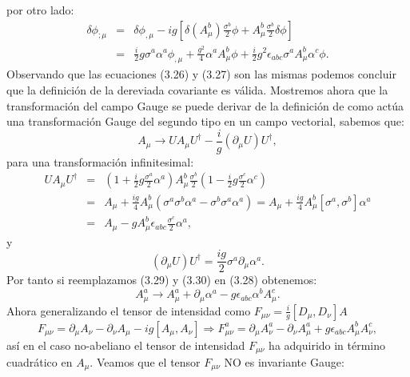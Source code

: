 por otro lado:
\begin{eqnarray}
\nonumber \delta\phi_{;\mu}&=&\delta\phi_{,\mu}-ig[\delta(A_{\mu}^{b})\frac{\sigma^{b}}{2}\phi+A_{\mu}^{b}\frac{\sigma^{b}}{2}\delta\phi]\\
&=&\frac{i}{2}g\sigma^{a}\alpha^{a}\phi_{,\mu}+\frac{g^{2}}{4}\alpha^{a}A_{\mu}^{b}\phi+\frac{i}{2}g^{2}\epsilon_{abc}\sigma^{a}A_{\mu}^{b}\alpha^{c}\phi .
\end{eqnarray}
Observando que las ecuaciones (3.26) y (3.27) son las mismas podemos concluir que la definición de la dereviada covariante es válida. Mostremos ahora que la transformación del campo Gauge se puede derivar de la definición de como actúa una transformación Gauge del segundo tipo en un campo vectorial, sabemos que:
\begin{equation}
A_\mu \to UA_\mu U^\dagger -\frac{i}{g}(\partial_\mu U)U^\dagger ,
\end{equation}
para una transformación infinitesimal:
\begin{eqnarray}
\nonumber UA_\mu U^{\dagger}&=&\left(1+\frac{i}{2}g\frac{\sigma^{a}}{2}\alpha^{a}\right)A_{\mu}^{b}\frac{\sigma^{b}}{2}(1-\frac{i}{2}g\frac{\sigma^{c}}{2}\alpha^{c})\\
\nonumber &=&A_\mu+\frac{ig}{4}A_{\mu}^{b}(\sigma^{a}\sigma^{b}\alpha^{a}-\sigma^{b}\sigma^{a}\alpha^{a})=A_{\mu}+\frac{ig}{4}A_{\mu}^{b}[\sigma^{a},\sigma^{b}]\alpha^{a}\\
&=&A_{\mu}-gA_{\mu}^{b}\epsilon_{abc}\frac{\sigma^{c}}{2}\alpha^{a} ,
\end{eqnarray}
y 
\begin{equation}
(\partial_\mu U)U^\dagger=\frac{ig}{2}\sigma^a\partial_\mu \alpha^a .
\end{equation}
Por tanto si reemplazamos (3.29) y (3.30) en (3.28) obtenemos:
\begin{equation}
A_{\mu}^{a}\to A_{\mu}^{a}+\partial_{\mu}\alpha^{a}-g\epsilon_{abc}\alpha^{b}A_{\mu}^{c}.
\end{equation}
Ahora generalizando el tensor de intensidad como $F_{\mu\nu}=\frac{i}{g}[D_\mu,D_\nu]A$
\begin{equation}
F_{\mu\nu}=\partial_{\mu}A_{\nu}-\partial_{\nu}A_{\mu}-ig[A_{\mu},A_{\nu}]\Rightarrow F_{\mu\nu}^{a}=\partial_{\mu}A_{\nu}^{a}-\partial_{\nu}A_{\mu}^{a}+g\epsilon_{abc}A_{\mu}^{b}A_{\nu}^{c} ,
\end{equation}
así en el caso no-abeliano el tensor de intensidad $F_{\mu\nu}$ ha adquirido in término cuadrático en $A_\mu$. Veamos que el tensor $F_{\mu\nu}$ NO es invariante Gauge:

